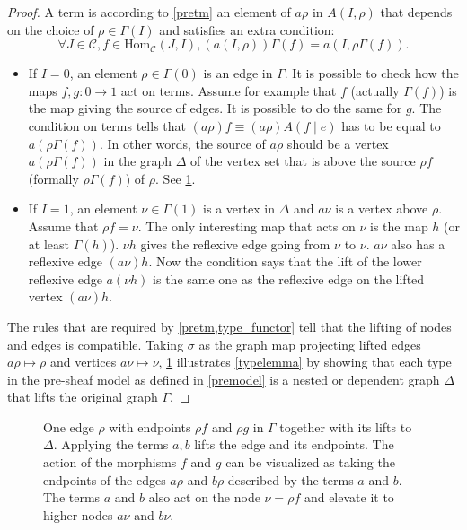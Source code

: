 \documentclass[12pt,a4paper,twoside,xetex]{book} %
\newcommand{\homo}[3]{\text{Hom}_{#1}\left(#2,#3\right)}
\begin{document}
\begin{proof}
A term is according to \cref{pretm} an element of $a\rho$ in $A(I,\rho)$ that 
depends on the choice of $\rho \in \Gamma (I)$ and satisfies an extra 
condition: $$\forall J \in \mathcal{C}, f \in \homo{\mathcal{C}}{J}{I}, 
(a(I,\rho))\Gamma(f)= a(I,\rho \Gamma (f)).$$ 
\begin{itemize}

\item If $I=0$, an element $\rho \in \Gamma (0)$ is an edge in $\Gamma$. It is 
possible to check how the maps $f,g:0\rightarrow 1$ act on terms. Assume for 
example that $f$ (actually $\Gamma(f)$)  is the map giving the source of edges. 
It is possible to do the same for $g$. The condition on terms tells that 
$(a\rho)f \equiv (a \rho)A(f \mid e)$ has to be equal to $a(\rho \Gamma (f))$. 
In other words, the source of $a\rho$ should be a vertex $a(\rho \Gamma (f))$ 
in the graph $\Delta$ of the vertex set that is above the source $\rho f$ 
(formally $\rho \Gamma (f)$) of $\rho$. See \cref{depgraphdiag}.


\item If $I = 1$, an  element $\nu \in \Gamma (1)$ is a vertex in $\Delta$ 
and $a\nu$ is a vertex above $\rho$. Assume that $\rho f = \nu$. The only 
interesting map that acts on $\nu$ is the map $h$ (or at least $\Gamma (h)$). 
$\nu h$ gives the reflexive edge going from $\nu$ to $\nu$. $a\nu$ also has a 
reflexive edge $(a\nu)h$. Now the condition says that the lift of the lower 
reflexive edge $a (\nu h)$ is the same one as the reflexive edge on the lifted 
vertex $(a \nu) h$. 
\end{itemize}

The rules that are required by \cref{pretm,type_functor} tell that the lifting 
of nodes and edges is compatible. Taking $\sigma$ as the graph map projecting lifted edges $a\rho \mapsto \rho$ and vertices $a\nu \mapsto \nu$, \cref{depgraphdiag} illustrates  \cref{typelemma} by showing that each type in the pre-sheaf model as defined in 
\cref{premodel} is a nested or dependent graph $\Delta$ that lifts 
the original graph $\Gamma$.
\end{proof}


\begin{figure}\label{depgraphdiag}
\begin{center} 

\end{center}
\caption{One edge $\rho$ with endpoints $\rho f$ and $\rho g$ in $\Gamma$ together with its lifts to $\Delta$. Applying the terms $a,b$ lifts the edge and its endpoints. The action of the morphisms $f$ and $g$ can be visualized as taking the endpoints of the edges $a\rho$
and $b\rho$ described by the terms $a$ and $b$. The terms $a$ and $b$ also act 
on the node $\nu = \rho f$ and elevate it to higher nodes $a\nu$ and $b\nu$. 
}
\end{figure}
\end{document}
